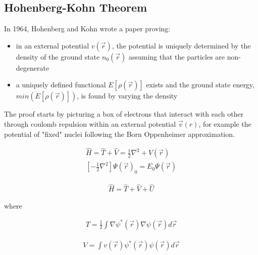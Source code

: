 \subsection{Hohenberg-Kohn Theorem}

In 1964, Hohenberg and Kohn wrote a paper proving:

\begin{itemize}
\item in an external potential $v(\vec{r})$, the potential is uniquely determined by the density of the ground state $n_0(\vec{r})$ assuming that the particles are non-degenerate
\item a uniquely defined functional $E[\rho(\vec{r})]$ exists and the ground state energy, $min(E[\rho(\vec{r})])$, is found by varying the density
\end{itemize}

The proof starts by picturing a box of electrons that interact with each other through coulomb repulsion within an external potential  $\vec{v}(r)$, for example the potential of "fixed" nuclei following the Born Oppenheimer approximation.

\begin{equation}
\begin{split}
\hat{H} = \hat{T} + \hat{V} = \frac{1}{2} \nabla^2 + V(\vec{r})\\
\left[-\frac{1}{2} \nabla^2 \right] \Psi(\vec{r})_{0} = E_{0} \Psi(\vec{r})
\end{split}
\label{eq:eqTimeIndependentSchrodinger}
\end{equation}

\begin{equation}
\begin{split}
\hat{H} = \hat{T} + \hat{V} + \hat{U}
\end{split}
\label{eq:eqTimeIndependentSchrodinger}
\end{equation}

where

\begin{equation}
\begin{split}
T = \frac{1}{2} \int \nabla \psi^{*}(\vec{r})\nabla \psi(\vec{r}) d\vec{r}
\end{split}
\label{eq:eqKinetic}
\end{equation}

\begin{equation}
\begin{split}
V = \int v(\vec{r}) \psi^{*}(\vec{r}) \psi (\vec{r}) d\vec{r} 
\end{split}
\label{eq:eqKinetic}
\end{equation}

